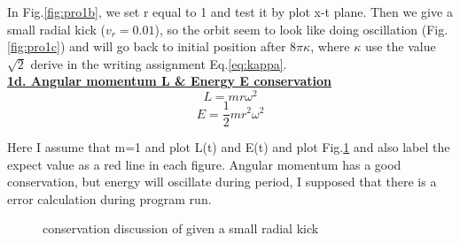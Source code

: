 \documentclass{article}
\begin{document}
In Fig.\ref{fig:pro1b}, we set r equal to 1 and test it by plot x-t plane.
Then we give a small radial kick ($v_r=0.01$), so the orbit seem to look like doing oscillation (Fig.\ref{fig:pro1c}) and will go back to initial position after $8\pi\kappa$, where $\kappa$ use the value $\sqrt{2}$ derive in the writing assignment Eq.\ref{eq:kappa}.
\\
\underline{\textbf{1d. Angular momentum L \& Energy E conservation}}
$$L=mr\omega^2$$
$$E=\frac{1}{2}mr^2\omega^2$$

Here I assume that m=1 and plot L(t) and E(t) and plot Fig.\ref{fig:pro1d} and also label the expect value as a red line in each figure.
Angular momentum has a good conservation, but energy will oscillate during period, I supposed that there is a error calculation during program run.\\
\begin{figure}[h]
    \centering
    \caption{conservation discussion of given a small radial kick}
    \label{fig:pro1d}
\end{figure}
\end{document}

